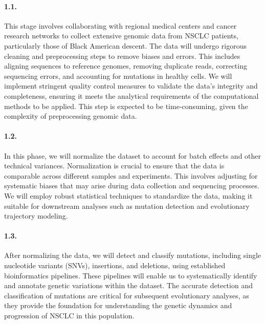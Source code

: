 

\paragraph{1.1. \SpecificAimOneA}

This stage involves collaborating with regional medical centers and cancer research networks to collect extensive genomic data from NSCLC patients, particularly those of Black American descent. The data will undergo rigorous cleaning and preprocessing steps to remove biases and errors. This includes aligning sequences to reference genomes, removing duplicate reads, correcting sequencing errors, and accounting for mutations in healthy cells. We will implement stringent quality control measures to validate the data's integrity and completeness, ensuring it meets the analytical requirements of the computational methods to be applied. This step is expected to be time-consuming, given the complexity of preprocessing genomic data.

\paragraph{1.2. \SpecificAimOneB}

In this phase, we will normalize the dataset to account for batch effects and other technical variances. Normalization is crucial to ensure that the data is comparable across different samples and experiments. This involves adjusting for systematic biases that may arise during data collection and sequencing processes. We will employ robust statistical techniques to standardize the data, making it suitable for downstream analyses such as mutation detection and evolutionary trajectory modeling.

\paragraph{1.3. \SpecificAimOneC}

After normalizing the data, we will detect and classify mutations, including single nucleotide variants (SNVs), insertions, and deletions, using established bioinformatics pipelines. These pipelines will enable us to systematically identify and annotate genetic variations within the dataset. The accurate detection and classification of mutations are critical for subsequent evolutionary analyses, as they provide the foundation for understanding the genetic dynamics and progression of NSCLC in this population.

